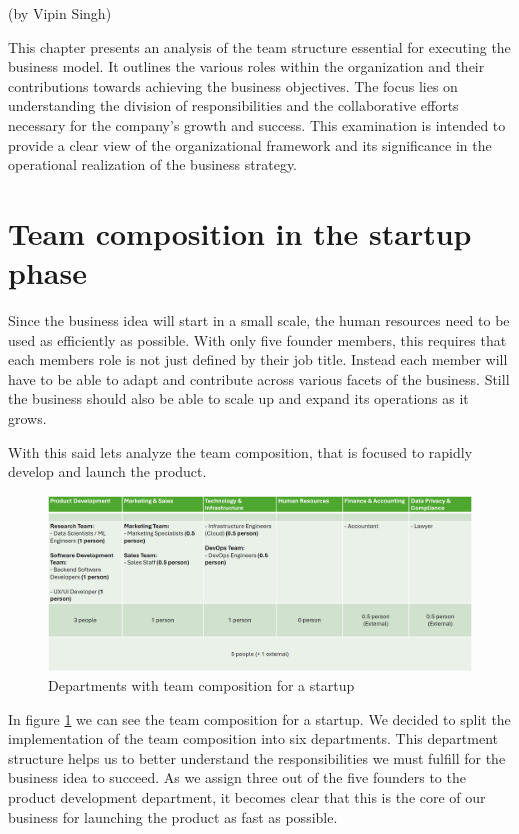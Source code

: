 (by Vipin Singh)

\p
This chapter presents an analysis of the team structure essential for executing the business model.
It outlines the various roles within the organization and their contributions towards achieving the business objectives.
The focus lies on understanding the division of responsibilities and the collaborative efforts necessary for the company's growth and success.
This examination is intended to provide a clear view of the organizational framework and its significance in the operational realization of the business strategy.

\section{Team composition in the startup phase}
\label{sec:team_comp_startup}
Since the business idea will start in a small scale, the human resources need to be used as efficiently as possible.
With only five founder members, this requires that each members role is not just defined by their job title.
Instead each member will have to be able to adapt and contribute across various facets of the business.
Still the business should also be able to scale up and expand its operations as it grows.

\p
With this said lets analyze the team composition, that is focused to rapidly develop and launch the product.

\begin{figure}[H]
    \centering
    \includegraphics[width=\textwidth]{figures/team_comp_startup.png}
    \caption{Departments with team composition for a startup}
    \label{fig:team_comp_startup}
\end{figure}

In figure \ref{fig:team_comp_startup} we can see the team composition for a startup.
We decided to split the implementation of the team composition into six departments.
This department structure helps us to better understand the responsibilities we must fulfill for the business idea to succeed.
As we assign three out of the five founders to the product development department, it becomes clear that this is the core of our business for launching the product as fast as possible.

